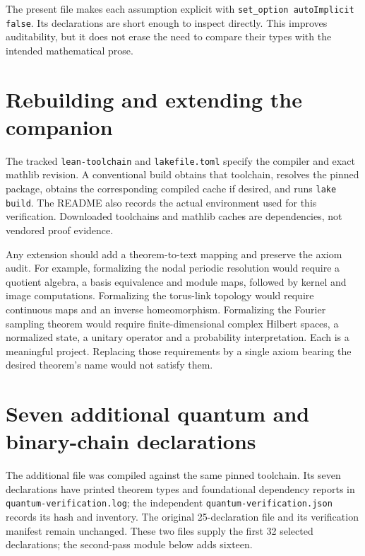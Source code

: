 The present file makes each assumption explicit with
\texttt{set\_option autoImplicit false}. Its declarations are short enough
to inspect directly. This improves auditability, but it does not erase the
need to compare their types with the intended mathematical prose.

\section{Rebuilding and extending the companion}

The tracked \texttt{lean-toolchain} and \texttt{lakefile.toml} specify the
compiler and exact mathlib revision. A conventional build obtains that
toolchain, resolves the pinned package, obtains the corresponding compiled
cache if desired, and runs \texttt{lake build}. The README also records the
actual environment used for this verification. Downloaded toolchains and
mathlib caches are dependencies, not vendored proof evidence.

Any extension should add a theorem-to-text mapping and preserve the axiom
audit. For example, formalizing the nodal periodic resolution would require
a quotient algebra, a basis equivalence and module maps, followed by kernel
and image computations. Formalizing the torus-link topology would require
continuous maps and an inverse homeomorphism. Formalizing the Fourier
sampling theorem would require finite-dimensional complex Hilbert spaces,
a normalized state, a unitary operator and a probability interpretation.
Each is a meaningful project. Replacing those requirements by a single
axiom bearing the desired theorem's name would not satisfy them.

\section{Seven additional quantum and binary-chain declarations}

The additional file  was compiled against the
same pinned toolchain. Its seven declarations have printed theorem types
and foundational dependency reports in \texttt{quantum-\allowbreak verification.log};
the independent \texttt{quantum-\allowbreak verification.json} records its hash and
inventory. The original 25-declaration file and its verification manifest
remain unchanged. These two files supply the first 32 selected declarations;
the second-pass module below adds sixteen.

